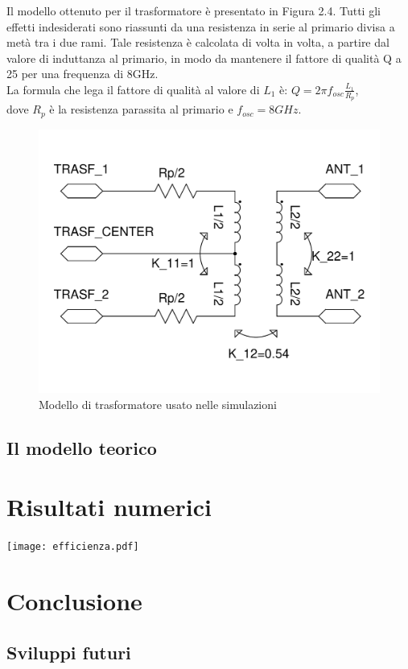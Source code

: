 \documentclass[a4paper, 12pt]{memoir}
\begin{document}
Il modello ottenuto per il trasformatore è presentato in Figura 2.4.
Tutti gli effetti indesiderati sono riassunti da una resistenza in serie al
primario divisa a metà tra i due rami. Tale resistenza è calcolata di volta in
volta, a partire dal valore di induttanza al primario, in modo da mantenere il
fattore di qualità Q a 25 per una frequenza di 8GHz.\\
La formula che lega il fattore di qualità al valore di $L_1$ è:
$ Q = 2\pi f_{osc} \frac{L_1}{R_p} $,\\
dove $R_p$ è la resistenza parassita al primario e $ f_{osc}=8GHz $.
\begin{figure}[h]
\centering
\includegraphics[height=0.34\textheight]{images/trasf_model.pdf}
\caption{Modello di trasformatore usato nelle simulazioni}
\end{figure}
\clearpage %
\section{Il modello teorico}

\cleardoublepage{}
\chapter{Risultati numerici}
\texttt{[image: efficienza.pdf]}

\cleardoublepage{}
\chapter{Conclusione}

\section{Sviluppi futuri}



\end{document}
